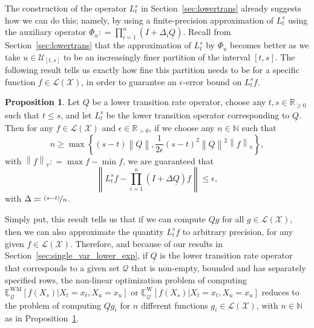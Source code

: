 \documentclass[10pt,a4paper]{paper}
\theoremstyle{definition}
\newtheorem{proposition}[theorem]{Proposition}
\newcommand{\nats}{\mathbb{N}}
\newcommand{\reals}{\mathbb{R}}
\newcommand{\realspos}{\reals_{>0}}
\newcommand{\realsnonneg}{\reals_{\geq 0}}
\newcommand{\states}{\mathcal{X}}
\newcommand{\gambles}{\mathcal{L}}
\newcommand{\gamblesX}{\gambles(\states)}
\newcommand{\rateset}{\mathcal{Q}}
\newcommand{\lrate}{\underline{Q}}
\newcommand{\norm}[1]{\left\lVert #1 \right\rVert}
\newcommand{\coloneqq}{:\!=}
\begin{document}
The construction of the operator $L_t^s$ in Section~\ref{sec:lowertrans} already suggests how we can do this; namely, by using a finite-precision approximation of $L_t^s$ using the auxiliary operator $\Phi_u\coloneqq \prod_{i=1}^n(I+\Delta_i\lrate)$. Recall from Section~\ref{sec:lowertrans} that the approximation of $L_t^s$ by $\Phi_u$ becomes better as we take $u\in\mathcal{U}_{[t,s]}$ to be an increasingly finer partition of the interval $[t,s]$. The following result tells us exactly how fine this partition needs to be for a specific function $f\in\gamblesX$, in order to guarantee an $\epsilon$-error bound on $L_t^sf$.

\begin{proposition}\label{prop:approximation_error_bound}
Let $\lrate$ be a lower transition rate operator, choose any $t,s\in\realsnonneg$ such that $t\leq s$, and let $L_t^s$ be the lower transition operator corresponding to $\lrate$. Then for any $f\in\gamblesX$ and $\epsilon\in\realspos$, if we choose any $n\in\nats$ such that
\begin{equation*}
n \geq\max\left\{
(s-t)\norm{\lrate},
\frac{1}{2\epsilon}(s-t)^2\norm{\lrate}^2\norm{f}_\mathrm{v}
\right\},
\end{equation*}
with $\norm{f}_\mathrm{v}\coloneqq\max f-\min f$,
we are guaranteed that
\begin{equation*}
\norm{L_t^sf - \prod_{i=1}^n(I + \Delta\lrate)f} \leq \epsilon,
\end{equation*}
with $\Delta\coloneqq \nicefrac{(s-t)}{n}$.
\end{proposition}

Simply put, this result tells us that if we can compute $\lrate g$ for all $g\in\gamblesX$, then we can also approximate the quantity $L_t^sf$ to arbitrary precision, for any given $f\in\gamblesX$. Therefore, and because of our results in Section~\ref{sec:single_var_lower_exp}, if $\lrate$ is the lower transition rate operator that corresponds to a given set $\rateset$ that is non-empty, bounded and has separately specified rows, the non-linear optimization problem of computing $\underline{\mathbb{E}}_\rateset^\mathrm{WM}[f(X_s)\vert X_t=x_t,X_u=x_u]$ or $\underline{\mathbb{E}}_\rateset^\mathrm{W}[f(X_s)\vert X_t=x_t,X_u=x_u]$ reduces to the problem of computing $\lrate g_i$ for $n$ different functions $g_i\in\gamblesX$, with $n\in\nats$ as in Proposition~\ref{prop:approximation_error_bound}.
\end{document}
